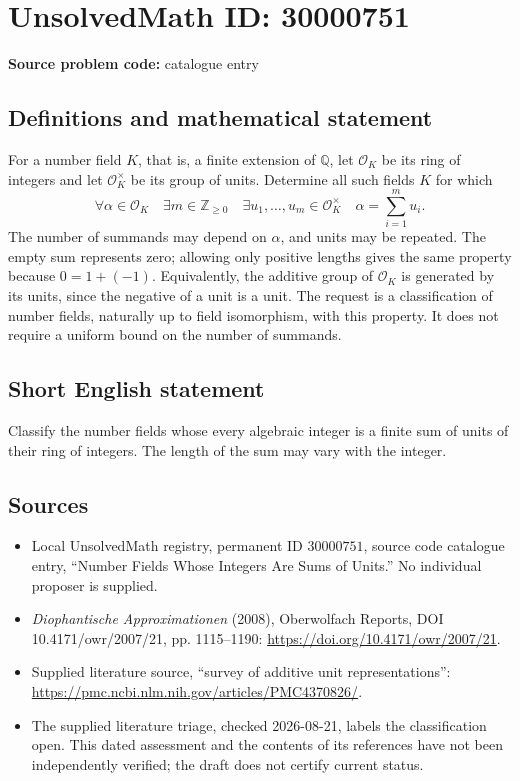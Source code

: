 \documentclass[11pt]{article}
\newcommand{\Z}{\mathbb{Z}}
\newcommand{\Q}{\mathbb{Q}}
\begin{document}
\section*{UnsolvedMath ID: 30000751}
\textbf{Source problem code:} catalogue entry
\subsection{Definitions and mathematical statement}
For a number field \(K\), that is, a finite extension of \(\Q\), let \(\mathcal O_K\) be its ring of integers and let \(\mathcal O_K^\times\) be its group of units. Determine all such fields \(K\) for which
\[
\forall\alpha\in\mathcal O_K\quad\exists m\in\Z_{\geq0}\quad\exists u_1,\ldots,u_m\in\mathcal O_K^\times
\quad \alpha=\sum_{i=1}^m u_i.
\]
The number of summands may depend on \(\alpha\), and units may be repeated. The empty sum represents zero; allowing only positive lengths gives the same property because \(0=1+(-1)\). Equivalently, the additive group of \(\mathcal O_K\) is generated by its units, since the negative of a unit is a unit. The request is a classification of number fields, naturally up to field isomorphism, with this property. It does not require a uniform bound on the number of summands.
\subsection{Short English statement}
Classify the number fields whose every algebraic integer is a finite sum of units of their ring of integers. The length of the sum may vary with the integer.
\subsection{Sources}
\begin{itemize}
\item Local UnsolvedMath registry, permanent ID \(30000751\), source code catalogue entry, ``Number Fields Whose Integers Are Sums of Units.'' No individual proposer is supplied.
\item \emph{Diophantische Approximationen} (2008), Oberwolfach Reports, DOI 10.4171/owr/2007/21, pp. 1115--1190: \url{https://doi.org/10.4171/owr/2007/21}.
\item Supplied literature source, ``survey of additive unit representations'': \url{https://pmc.ncbi.nlm.nih.gov/articles/PMC4370826/}.
\item The supplied literature triage, checked 2026-08-21, labels the classification open. This dated assessment and the contents of its references have not been independently verified; the draft does not certify current status.
\end{itemize}
\end{document}

